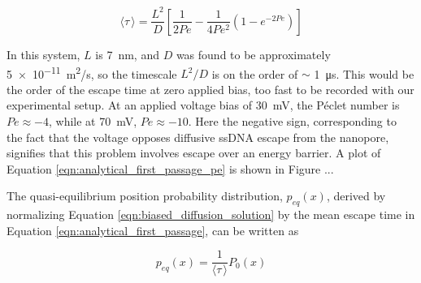 \begin{equation}
\langle \tau \, \rangle = \frac{L^2}{D} \left[ \frac{1}{2 Pe} - \frac{1}{4 Pe^2} \left( 1 - e^{-2Pe} \right) \right]
\label{eqn:analytical_first_passage_pe}
\end{equation}

In this system, $L$ is \SI{7}{\nm}, and $D$ was found to be approximately \SI{5e-11}{\m^2/\s}, so the timescale $L^2/D$ is on the order of $\sim$ \SI{1}{\us}.  This would be the order of the escape time at zero applied bias, too fast to be recorded with our experimental setup.  At an applied voltage bias of \SI{30}{\mV}, the Péclet number is $Pe \approx -4$, while at \SI{70}{\mV}, $Pe \approx -10$.  Here the negative sign, corresponding to the fact that the voltage opposes diffusive ssDNA escape from the nanopore, signifies that this problem involves escape over an energy barrier.  A plot of Equation \ref{eqn:analytical_first_passage_pe} is shown in Figure ...

The quasi-equilibrium position probability distribution, $p_{eq}(x)$, derived by normalizing Equation \ref{eqn:biased_diffusion_solution} by the mean escape time in Equation \ref{eqn:analytical_first_passage}, can be written as

\begin{equation}
p_{eq}(x) = \frac{1}{\langle \tau \, \rangle} P_0(x)
\label{eqn:biased_diffusion_equilibrium}
\end{equation}
